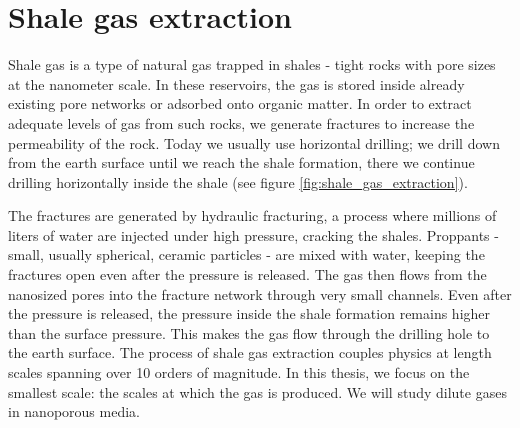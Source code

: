 \section{Shale gas extraction}
\label{sec:shale_gas_extraction}
Shale gas is a type of natural gas trapped in shales - tight rocks with pore sizes at the nanometer scale. In these reservoirs, the gas is stored inside already existing pore networks or adsorbed onto organic matter. In order to extract adequate levels of gas from such rocks, we generate fractures to increase the permeability of the rock. Today we usually use horizontal drilling; we drill down from the earth surface until we reach the shale formation, there we continue drilling horizontally inside the shale (see figure \ref{fig:shale_gas_extraction}).

The fractures are generated by hydraulic fracturing, a process where millions of liters of water are injected under high pressure, cracking the shales. Proppants - small, usually spherical, ceramic particles - are mixed with water, keeping the fractures open even after the pressure is released. The gas then flows from the nanosized pores into the fracture network through very small channels. Even after the pressure is released, the pressure inside the shale formation remains higher than the surface pressure. This makes the gas flow through the drilling hole to the earth surface. The process of shale gas extraction couples physics at length scales spanning over 10 orders of magnitude. In this thesis, we focus on the smallest scale: the scales at  
which the gas is produced. We will study dilute gases in nanoporous media.

